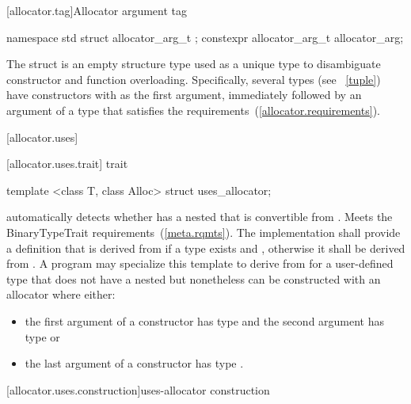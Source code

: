 [allocator.tag]{Allocator argument tag}

\begin{itemdecl}
namespace std {
  struct allocator_arg_t { };
  constexpr allocator_arg_t allocator_arg{};
}
\end{itemdecl}

\pnum
The  struct is an empty structure type used as a unique type to
disambiguate constructor and function overloading. Specifically, several types (see
~\ref{tuple}) have constructors with  as the first
argument, immediately followed by an argument of a type that satisfies the
 requirements~(\ref{allocator.requirements}).

[allocator.uses]{}

[allocator.uses.trait]{ trait}

%
\begin{itemdecl}
template <class T, class Alloc> struct uses_allocator;
\end{itemdecl}

\begin{itemdescr}
\pnum
\remark automatically detects whether  has a nested  that
is convertible from . Meets the BinaryTypeTrait
requirements~(\ref{meta.rqmts}). The implementation shall provide a definition that is
derived from  if a type  exists and
, otherwise it shall be
derived from . A program may specialize this template to derive from
 for a user-defined type  that does not have a nested
 but nonetheless can be constructed with an allocator where
either:

\begin{itemize}
\item the first argument of a constructor has type  and the
second argument has type  or

\item the last argument of a constructor has type .
\end{itemize}
\end{itemdescr}

[allocator.uses.construction]{uses-allocator construction}


